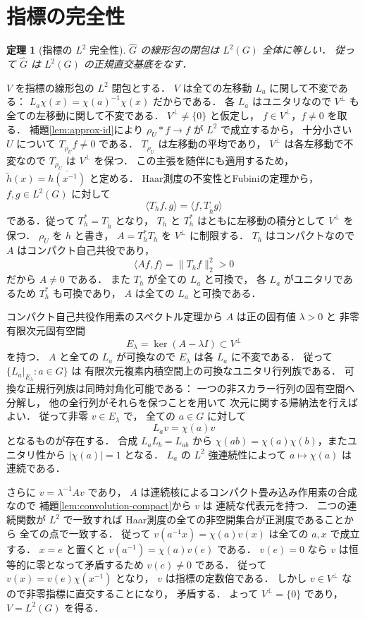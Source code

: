 \documentclass[a5paper,10pt,onecolumn]{jsarticle}
\makeatletter
\theoremstyle{mathnotetheorem}
\newtheorem{theorem}{定理}[section]
\renewcommand{\proofname}{証明}
\renewenvironment{proof}[1][\proofname]{%
  \par\pushQED{\qed}\normalfont\topsep4\p@\@plus2\p@\relax
  \trivlist\item[\hskip\labelsep\bfseries #1]\ignorespaces
}{\popQED\endtrivlist\@endpefalse}
\newcommand{\norm}[1]{\lVert #1\rVert}
\makeatother
\begin{document}
\section{指標の完全性}

\begin{theorem}[指標の $L^2$ 完全性]\label{thm:characters-complete}
$\widehat G$ の線形包の閉包は $L^2(G)$ 全体に等しい．
従って $\widehat G$ は $L^2(G)$ の正規直交基底をなす．
\end{theorem}
\begin{proof}
$V$ を指標の線形包の $L^2$ 閉包とする．
$V$ は全ての左移動 $L_a$ に関して不変である：
$L_a\chi(x)=\chi(a)^{-1}\chi(x)$ だからである．
各 $L_a$ はユニタリなので
$V^\perp$ も全ての左移動に関して不変である．
$V^\perp\ne\{0\}$ と仮定し，
$f\in V^\perp$，$f\ne0$ を取る．
補題\ref{lem:approx-id}により
$\rho_U*f\to f$ が $L^2$ で成立するから，
十分小さい $U$ について
$T_{\rho_U}f\ne0$ である．
$T_{\rho_U}$ は左移動の平均であり，
$V^\perp$ は各左移動で不変なので
$T_{\rho_U}$ は $V^\perp$ を保つ．
この主張を随伴にも適用するため，
$\widetilde h(x)=\overline{h(x^{-1})}$ と定める．
Haar測度の不変性とFubiniの定理から，
$f,g\in L^2(G)$ に対して
\[
 \langle T_hf,g\rangle=\langle f,T_{\widetilde h}g\rangle
\]
である．従って $T_h^*=T_{\widetilde h}$ となり，
$T_h$ と $T_h^*$ はともに左移動の積分として
$V^\perp$ を保つ．
$\rho_U$ を $h$ と書き，
$A=T_h^*T_h$ を $V^\perp$ に制限する．
$T_h$ はコンパクトなので $A$ はコンパクト自己共役であり，
\[
 \langle Af,f\rangle=\norm{T_hf}_2^2>0
\]
だから $A\ne0$ である．
また $T_h$ が全ての $L_a$ と可換で，
各 $L_a$ がユニタリであるため $T_h^*$ も可換であり，
$A$ は全ての $L_a$ と可換である．

コンパクト自己共役作用素のスペクトル定理から
$A$ は正の固有値 $\lambda>0$ と
非零有限次元固有空間
\[
 E_\lambda=\ker(A-\lambda I)\subset V^\perp
\]
を持つ．
$A$ と全ての $L_a$ が可換なので
$E_\lambda$ は各 $L_a$ に不変である．
従って $\{L_a|_{E_\lambda}:a\in G\}$ は
有限次元複素内積空間上の可換なユニタリ行列族である．
可換な正規行列族は同時対角化可能である：
一つの非スカラー行列の固有空間へ分解し，
他の全行列がそれらを保つことを用いて
次元に関する帰納法を行えばよい．
従って非零 $v\in E_\lambda$ で，
全ての $a\in G$ に対して
\[
 L_av=\chi(a)v
\]
となるものが存在する．
合成 $L_aL_b=L_{ab}$ から
$\chi(ab)=\chi(a)\chi(b)$，またユニタリ性から
$|\chi(a)|=1$ となる．
$L_a$ の $L^2$ 強連続性によって
$a\mapsto\chi(a)$ は連続である．

さらに $v=\lambda^{-1}Av$ であり，
$A$ は連続核によるコンパクト畳み込み作用素の合成なので
補題\ref{lem:convolution-compact}から $v$ は
連続な代表元を持つ．
二つの連続関数が $L^2$ で一致すれば
Haar測度の全ての非空開集合が正測度であることから
全ての点で一致する．
従って
$v(a^{-1}x)=\chi(a)v(x)$ は全ての $a,x$ で成立する．
$x=e$ と置くと
$v(a^{-1})=\chi(a)v(e)$ である．
$v(e)=0$ なら $v$ は恒等的に零となって矛盾するため
$v(e)\ne0$ である．
従って
$v(x)=v(e)\chi(x^{-1})$ となり，
$v$ は指標の定数倍である．
しかし $v\in V^\perp$ なので非零指標に直交することになり，
矛盾する．
よって $V^\perp=\{0\}$ であり，
$V=L^2(G)$ を得る．
\end{proof}
\end{document}
